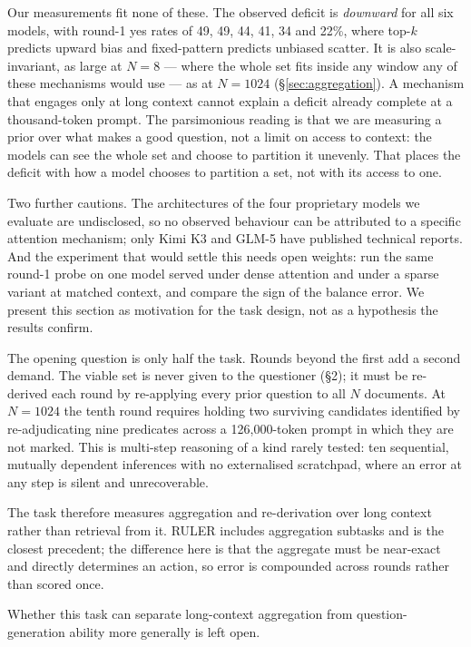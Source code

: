 \documentclass[11pt]{article}
\begin{document}
Our measurements fit none of these. The observed deficit is \emph{downward} for
all six models, with round-1 yes rates of 49, 49, 44, 41, 34 and 22\%, where
top-$k$ predicts upward bias and fixed-pattern predicts unbiased scatter. It is
also scale-invariant, as large at $N{=}8$ — where the whole set fits inside any
window any of these mechanisms would use — as at $N{=}1024$
(\S\ref{sec:aggregation}). A mechanism that engages only at long context cannot
explain a deficit already complete at a thousand-token prompt. The parsimonious
reading is that we are measuring a prior over what makes a good question, not a
limit on access to context: the models can see the whole set and choose to
partition it unevenly. That places the deficit with how a model
chooses to partition a set, not with its access to one.

Two further cautions. The architectures of the four proprietary models we
evaluate are undisclosed, so no observed behaviour can be attributed to a
specific attention mechanism; only Kimi K3 \citep{kimi2026k3} and GLM-5
\citep{zhipu2026glm5} have published technical reports. And the experiment that
would settle this needs open weights: run the same round-1 probe on one model
served under dense attention and under a sparse variant at matched context, and
compare the sign of the balance error. We present this section as motivation for
the task design, not as a hypothesis the results confirm.

The opening question is only half the task. Rounds beyond the first add a
second demand. The viable set is never given to
the questioner (\S2); it must be re-derived each round by re-applying every
prior question to all $N$ documents. At $N=1024$ the tenth round requires
holding two surviving candidates identified by re-adjudicating nine predicates
across a 126{,}000-token prompt in which they are not marked. This is
multi-step reasoning of a kind rarely tested: ten sequential, mutually
dependent inferences with no externalised scratchpad, where an error at any
step is silent and unrecoverable.

The task therefore measures aggregation and re-derivation over long context
rather than retrieval from it. RULER \citep{hsieh2024} includes aggregation
subtasks and is the closest precedent; the difference here is that the
aggregate must be near-exact and directly determines an action, so error is
compounded across rounds rather than scored once.

Whether this task can separate long-context aggregation from
question-generation ability more generally is left open.
\end{document}
